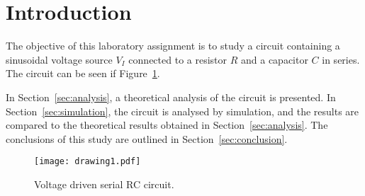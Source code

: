 \section{Introduction}
\label{sec:introduction}

The objective of this laboratory assignment is to study a circuit containing a
sinusoidal voltage source $V_I$ connected to a resistor $R$ and a capacitor $C$
in series. The circuit can be seen if Figure~\ref{fig:rc}.

\lipsum[1-1]

In Section~\ref{sec:analysis}, a theoretical analysis of the circuit is
presented. In Section~\ref{sec:simulation}, the circuit is analysed by
simulation, and the results are compared to the theoretical results obtained in
Section~\ref{sec:analysis}. The conclusions of this study are outlined in
Section~\ref{sec:conclusion}.


\begin{figure}[h] \centering
\texttt{[image: drawing1.pdf]}
\caption{Voltage driven serial RC circuit.}
\label{fig:rc}
\end{figure}

